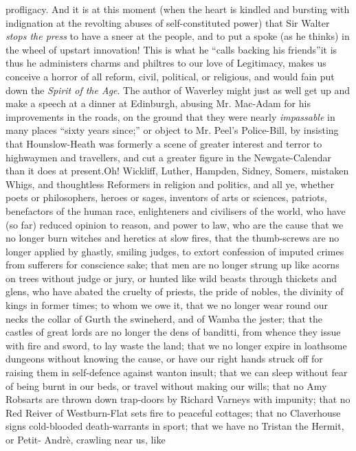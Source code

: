 profligacy. And it is at this moment (when the heart is kindled
and bursting with indignation at the revolting abuses of
self-constituted power) that Sir Walter \emph{stops the press} to have
a sneer at the people, and to put a spoke (as he thinks) in the
wheel of upstart innovation! This is what he ``calls backing his
friends''\textemdash it is thus he administers charms and philtres to our
love of Legitimacy, makes us conceive a horror of all reform,
civil, political, or religious, and would fain put down the
\emph{Spirit of the Age}. The author of Waverley might just as well get
up and make a speech at a dinner at Edinburgh, abusing
Mr. Mac-Adam for his improvements in the roads, on the ground that
they were nearly \emph{impassable} in many places ``sixty years since;''
or object to Mr. Peel's Police-Bill, by insisting that
Hounslow-Heath was formerly a scene of greater interest and terror
to highwaymen and travellers, and cut a greater figure in the
Newgate-Calendar than it does at present.\textemdash Oh! Wickliff, Luther,
Hampden, Sidney, Somers, mistaken Whigs, and thoughtless Reformers
in religion and politics, and all ye, whether poets or
philosophers, heroes or sages, inventors of arts or sciences,
patriots, benefactors of the human race, enlighteners and
civilisers of the world, who have (so far) reduced opinion to
reason, and power to law, who are the cause that we no longer burn
witches and heretics at slow fires, that the thumb-screws are no
longer applied by ghastly, smiling judges, to extort confession of
imputed crimes from sufferers for conscience sake; that men are no
longer strung up like acorns on trees without judge or jury, or
hunted like wild beasts through thickets and glens, who have
abated the cruelty of priests, the pride of nobles, the divinity
of kings in former times; to whom we owe it, that we no longer
wear round our necks the collar of Gurth the swineherd, and of
Wamba the jester; that the castles of great lords are no longer
the dens of banditti, from whence they issue with fire and sword,
to lay waste the land; that we no longer expire in loathsome
dungeons without knowing the cause, or have our right hands struck
off for raising them in self-defence against wanton insult; that
we can sleep without fear of being burnt in our beds, or travel
without making our wills; that no Amy Robsarts are thrown down
trap-doors by Richard Varneys with impunity; that no Red Reiver of
Westburn-Flat sets fire to peaceful cottages; that no Claverhouse
signs cold-blooded death-warrants in sport; that we have no
Tristan the Hermit, or Petit- Andrè, crawling near us, like
